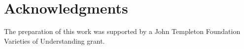 \documentclass[10pt,letterpaper]{article}
\begin{document}
\vspace{-.3cm}
\section{Acknowledgments}
\vspace{-.2cm}
The preparation of this work was supported by a John Templeton Foundation Varieties of Understanding grant.
\vspace{-.2cm}


\setlength{\bibleftmargin}{.125in}
\setlength{\bibindent}{-\bibleftmargin}


\end{document}

